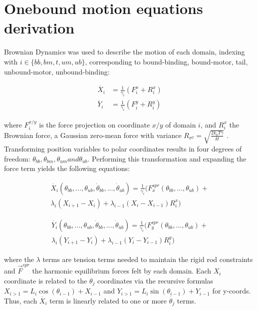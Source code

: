 \documentclass[9pt,twocolumn,twoside]{pnas-new}
\begin{document}
{  \section*{Onebound motion equations derivation}
  Brownian Dynamics was used to describe the motion of each domain, indexing with $i \in \{bb, bm, t, um, ub\}$, corresponding to bound-binding, bound-motor, tail, unbound-motor, unbound-binding:

  \begin{align}
    \dot{X_i} &= \frac{1}{\gamma_i}\left(F^x_i + R^x_i\right)\\
    \dot{Y_i} &= \frac{1}{\gamma_i}\left(F^y_i + R^y_i\right)
  \end{align}

  where $F^{x/y}_i$ is the force projection on coordinate $x/y$ of domain $i$, and $R^x_i$ the Brownian force, a Gaussian zero-mean force with variance $R_{\sigma^2} = \sqrt{\frac{2k_bT\gamma}{\delta t}}$ \cite{einstein}. Transforming position variables to polar coordinates results in four degrees of freedom: $\theta_{bb}, \theta_{bm}, \theta_{um} and \theta_{ub}$. Performing this transformation and expanding the force term yields the following equations:

  \begin{multline}
    \dot{X_i}\left(\theta_{bb}, ..., \theta_{ub}, \dot{\theta}_{bb}, ..., \dot{\theta}_{ub}\right) = \frac{1}{\gamma_i}\big(F^{spr}_x(\theta_{bb}, ..., \theta_{ub}) + \\
    \lambda_i\left(X_{i+1}-X_i\right) + \lambda_{i-1}\left(X_i-X_{i-1}\right)R^x_i\big)
    \label{eq:ob-system}
  \end{multline}

  \begin{multline}
    \dot{Y_i}\left(\theta_{bb}, ..., \theta_{ub}, \dot{\theta}_{bb}, ..., \dot{\theta}_{ub}\right) = \frac{1}{\gamma_i}\big(F^{spr}_y(\theta_{bb}, ..., \theta_{ub}) + \\
    \lambda_i\left(Y_{i+1}-Y_i\right) + \lambda_{i-1}\left(Y_i-Y_{i-1}\right)R^y_i\big)
    \label{eq:ob-system}
  \end{multline}

  where the $\lambda$ terms are tension terms needed to maintain the rigid rod constraints and $\vec{F}^{spr}$ the harmonic equilibrium forces felt by each domain. Each $X_i$ coordinate is related to the $\theta_j$ coordinates via the recursive formulas $X_{i>1} = L_i\cos(\theta_{i-1})+X_{i-1}$ and $Y_{i>1} = L_i\sin(\theta_{i-1})+Y_{i-1}$ for y-coords. Thus, each $\dot{X_i}$ term is linearly related to one or more $\dot{\theta_j}$ terms.\\

}
\end{document}
